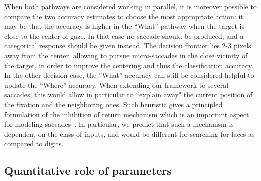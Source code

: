 When both pathways are considered working in parallel, it is moreover possible to compare the two accuracy estimates to choose the most appropriate action: it may be that the accuracy is higher in the ``What'' pathway when the target is close to the center of gaze. In that case no saccade should be produced, and a categorical response should be given instead. The decision frontier lies 2-3 pixels away from the center, %
allowing to pursue micro-saccades in the close vicinity of the target, in order to improve the centering and thus the classification accuracy. 
In the other decision case, the ''What'' accuracy can still be considered helpful to update the ``Where'' accuracy. 
When extending our framework to several saccades, this would allow in particular to ``explain away" the current position of the fixation and the neighboring ones. Such heuristic gives a principled formulation of the inhibition of return mechanism which is an important aspect for modeling saccades~\citep{Itti01}. In particular, we predict that such a mechanism is dependent on the class of inputs, and would be different for searching for faces as compared to digits. 

\subsection{Quantitative role of parameters}


